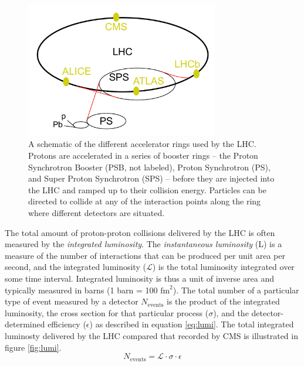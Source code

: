 \begin{figure}
	\centering
	\includegraphics[width=0.75\textwidth]{detector/figs/LHC}
	\caption{A schematic of the different accelerator rings used by the LHC. Protons are accelerated in a series of booster rings -- the Proton Synchrotron Booster (PSB, not labeled), Proton Synchrotron (PS), and Super Proton Synchrotron (SPS) -- before they are injected into the LHC and ramped up to their collision energy. Particles can be directed to collide at any of the interaction points along the ring where different detectors are situated. \cite{cc}}
	\label{fig:lhcSchematic}
\end{figure}

The total amount of proton-proton collisions delivered by the LHC is often measured by the {\it integrated luminosity}. The {\it instantaneous luminosity} (L) is a measure of the number of interactions that can be produced per unit area per second, and the integrated luminosity ($\mathcal{L}$) is the total luminosity integrated over some time interval. Integrated luminosity is thus a unit of inverse area and typically measured in barns (1 barn = 100 $\text{fm}^2$). The total number of a particular type of event measured by a detector $N_{\mathrm{events}}$ is the product of the integrated luminosity, the cross section for that particular process ($\sigma$), and the detector-determined efficiency ($\epsilon$) as described in equation \ref{eq:lumi}. The total integrated luminosty delivered by the LHC compared that recorded by CMS is illustrated in figure \ref{fig:lumi}.
\begin{equation}
	N_{\mathrm{events}} = \mathcal{L} \cdot \sigma \cdot \epsilon
	\label{eq:lumi}
\end{equation}

